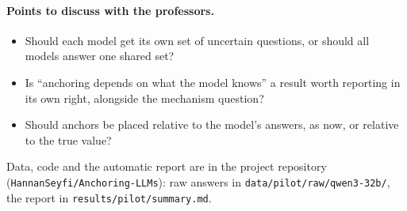 \documentclass[11pt,a4paper]{article}
\begin{document}
\paragraph{Points to discuss with the professors.}
\begin{itemize}
  \item Should each model get its own set of uncertain questions, or should all models answer one shared set?
  \item Is \enquote{anchoring depends on what the model knows} a result worth reporting in its own right, alongside the mechanism question?
  \item Should anchors be placed relative to the model's answers, as now, or relative to the true value?
\end{itemize}

\bigskip
\noindent\small Data, code and the automatic report are in the project repository (\texttt{HannanSeyfi/Anchoring-LLMs}): raw answers in \texttt{data/pilot/raw/qwen3-32b/}, the report in \texttt{results/pilot/summary.md}.



\end{document}
